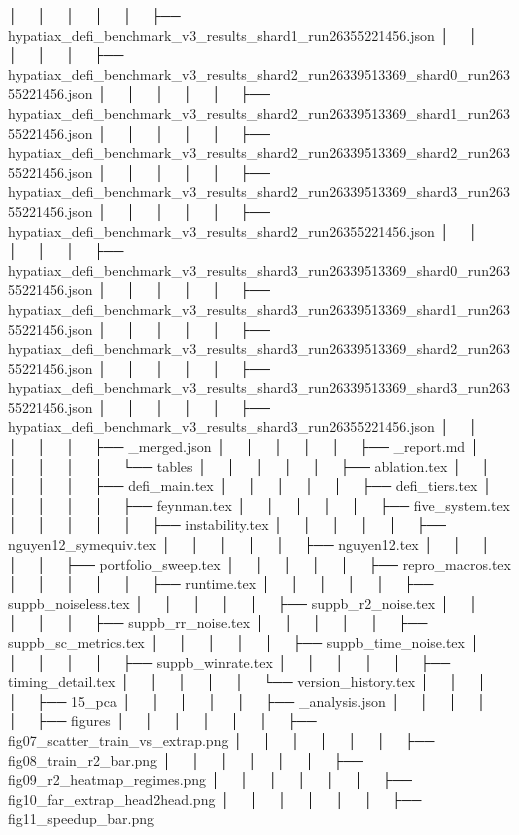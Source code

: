 │   │       │   │   │   ├── hypatiax_defi_benchmark_v3_results_shard1_run26355221456.json
│   │       │   │   │   ├── hypatiax_defi_benchmark_v3_results_shard2_run26339513369_shard0_run26355221456.json
│   │       │   │   │   ├── hypatiax_defi_benchmark_v3_results_shard2_run26339513369_shard1_run26355221456.json
│   │       │   │   │   ├── hypatiax_defi_benchmark_v3_results_shard2_run26339513369_shard2_run26355221456.json
│   │       │   │   │   ├── hypatiax_defi_benchmark_v3_results_shard2_run26339513369_shard3_run26355221456.json
│   │       │   │   │   ├── hypatiax_defi_benchmark_v3_results_shard2_run26355221456.json
│   │       │   │   │   ├── hypatiax_defi_benchmark_v3_results_shard3_run26339513369_shard0_run26355221456.json
│   │       │   │   │   ├── hypatiax_defi_benchmark_v3_results_shard3_run26339513369_shard1_run26355221456.json
│   │       │   │   │   ├── hypatiax_defi_benchmark_v3_results_shard3_run26339513369_shard2_run26355221456.json
│   │       │   │   │   ├── hypatiax_defi_benchmark_v3_results_shard3_run26339513369_shard3_run26355221456.json
│   │       │   │   │   ├── hypatiax_defi_benchmark_v3_results_shard3_run26355221456.json
│   │       │   │   │   ├── _merged.json
│   │       │   │   │   ├── _report.md
│   │       │   │   │   └── tables
│   │       │   │   │       ├── ablation.tex
│   │       │   │   │       ├── defi_main.tex
│   │       │   │   │       ├── defi_tiers.tex
│   │       │   │   │       ├── feynman.tex
│   │       │   │   │       ├── five_system.tex
│   │       │   │   │       ├── instability.tex
│   │       │   │   │       ├── nguyen12_symequiv.tex
│   │       │   │   │       ├── nguyen12.tex
│   │       │   │   │       ├── portfolio_sweep.tex
│   │       │   │   │       ├── repro_macros.tex
│   │       │   │   │       ├── runtime.tex
│   │       │   │   │       ├── suppb_noiseless.tex
│   │       │   │   │       ├── suppb_r2_noise.tex
│   │       │   │   │       ├── suppb_rr_noise.tex
│   │       │   │   │       ├── suppb_sc_metrics.tex
│   │       │   │   │       ├── suppb_time_noise.tex
│   │       │   │   │       ├── suppb_winrate.tex
│   │       │   │   │       ├── timing_detail.tex
│   │       │   │   │       └── version_history.tex
│   │       │   │   ├── 15_pca
│   │       │   │   │   ├── _analysis.json
│   │       │   │   │   ├── figures
│   │       │   │   │   │   ├── fig07_scatter_train_vs_extrap.png
│   │       │   │   │   │   ├── fig08_train_r2_bar.png
│   │       │   │   │   │   ├── fig09_r2_heatmap_regimes.png
│   │       │   │   │   │   ├── fig10_far_extrap_head2head.png
│   │       │   │   │   │   ├── fig11_speedup_bar.png
